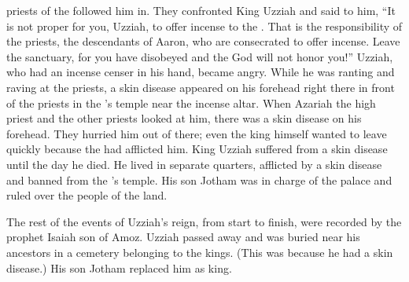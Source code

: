 {priests
of the {}
followed him in.
They confronted
King
Uzziah
and said
to him, “It is not proper
for you, Uzziah,
to offer incense
to the
{}. That
is the responsibility of the priests,
the descendants
of Aaron,
who are consecrated
to offer incense.
Leave
the sanctuary,
for
you have disobeyed
and the
{}
God
will not
honor you!”
Uzziah,
who had an incense
censer
in his hand,
became angry.
While he was ranting and raving
at the priests,
a skin disease
appeared
on his forehead
right there in front
of the priests
in the
{}’s
temple
near
the incense
altar.
When
Azariah
the high
priest
and the other
priests
looked at
him, there was a skin disease
on his forehead.
They hurried
him out
of there;
even
the king himself
wanted to leave
quickly
because
the {}
had afflicted him.
King
Uzziah
suffered from a skin disease
until
the day
he died.
He lived
in separate
quarters,
afflicted by a skin disease
and banned from
the
{}’s
temple.
His son
Jotham
was in charge
of the palace
and ruled
over the
people
of the land.
\par }{\PP {}The rest
of the events
of Uzziah’s
reign, from start
to finish,
were recorded
by the prophet
Isaiah
son
of Amoz.
Uzziah
passed away
and was buried
near his ancestors
in a cemetery
belonging to the kings.
(This was because
he had a skin disease.) His son
Jotham
replaced
him as king.

\par }
